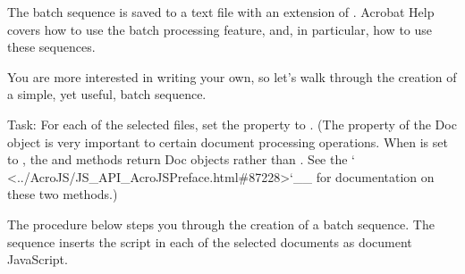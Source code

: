 \documentclass[letterpaper,12pt,english,openany,oneside]{sphinxmanual}
\begin{document}
\begin{sphinxVerbatim}[commandchars=\\\{\}]
  
 
 
   
  
    
  
    
\end{sphinxVerbatim}

The batch sequence is saved to a text file with an extension of  . Acrobat Help covers how to use the batch processing feature, and, in particular, how to use these sequences.

You are more interested in writing your own, so let’s walk through the creation of a simple, yet useful, batch sequence.

Task: For each of the selected files, set the  property to  . (The  property of the Doc object is very important to certain document processing operations. When  is set to  , the  and  methods return Doc objects rather than  . See the ` <../AcroJS/JS\_API\_AcroJSPreface.html\#87228>`\_\_ for documentation on these two methods.)

The procedure below steps you through the creation of a batch sequence. The sequence inserts the script  in each of the selected documents as document JavaScript.
\end{document}
